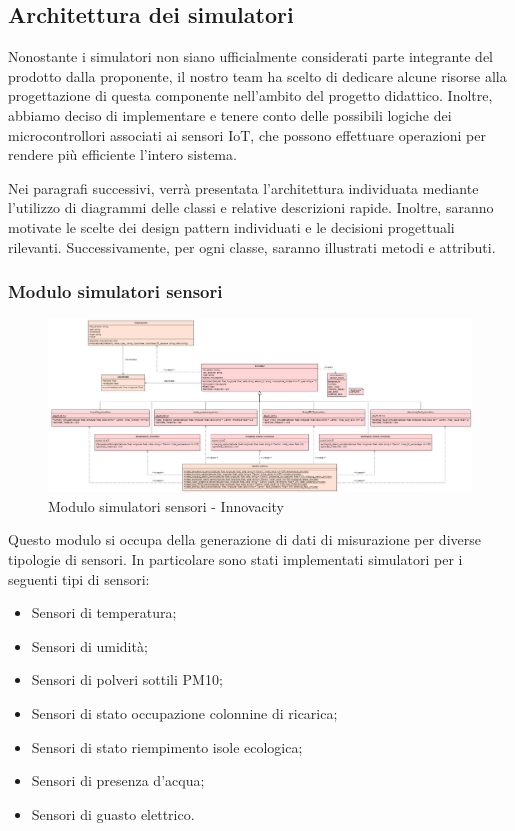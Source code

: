 \subsection{Architettura dei simulatori} \label{sec:architettura_simulatori}
Nonostante i simulatori non siano ufficialmente considerati parte integrante del prodotto dalla proponente, il nostro team ha scelto di dedicare alcune risorse alla progettazione di questa componente nell'ambito del progetto didattico. Inoltre, abbiamo deciso di implementare e tenere conto delle possibili logiche dei microcontrollori associati ai sensori IoT, che possono effettuare operazioni per rendere più efficiente l'intero sistema.

Nei paragrafi successivi, verrà presentata l'architettura individuata mediante l'utilizzo di diagrammi delle classi e relative descrizioni rapide. Inoltre, saranno motivate le scelte dei design pattern individuati e le decisioni progettuali rilevanti. Successivamente, per ogni classe, saranno illustrati metodi e attributi.
\subsubsection{Modulo simulatori sensori}
\begin{figure}[H]
    \centering
    \includegraphics[width=1.1\textwidth]{../Images/SpecificaTecnica/simulatoriSensori.PNG}
    \caption{Modulo simulatori sensori - Innovacity}
    \label{fig: Modulo_simulatori_sensori}
\end{figure}
Questo modulo si occupa della generazione di dati di misurazione per diverse tipologie di sensori.
In particolare sono stati implementati simulatori per i seguenti tipi di sensori:
\begin{itemize}
    \item Sensori di temperatura;
    \item Sensori di umidità;
    \item Sensori di polveri sottili PM10;
    \item Sensori di stato occupazione colonnine di ricarica;
    \item Sensori di stato riempimento isole ecologica;
    \item Sensori di presenza d'acqua;
    \item Sensori di guasto elettrico.
\end{itemize}
